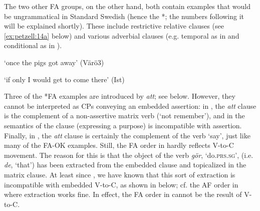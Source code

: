 \documentclass[output=paper,colorlinks,citecolor=brown,draft,draftmode]{langscibook}
\begin{document}
The two other FA groups, on the other hand, both contain examples that would be ungrammatical in Standard Swedish (hence the *; the numbers following it will be explained shortly). These include restrictive relative clauses (see \ref{ex:petzell:14a} below) and various adverbial clauses (e.g. temporal as in  and conditional as in ).


\ea\label{ex:petzell:14}

\glt `once the pigs got away’ (Värö3)

\glt `if only I would get to come there’ (Ist)
\z
\z


Three of the *FA examples are introduced by \textit{att}; see  below. However, they cannot be interpreted as CPs conveying an embedded assertion: in , the \textit{att} clause is the complement of a non-assertive matrix verb (‘not remember’), and in  the semantics of the clause (expressing a purpose) is incompatible with assertion. Finally, in , the \textit{att} clause is certainly the complement of the verb ‘say’, just like many of the FA-OK examples. Still, the FA order in  hardly reflects V-to-C movement. The reason for this is that the object of the verb \textit{gör}, ‘do.\textsc{prs}.\textsc{sg}’, (i.e. \textit{de}, ‘that’) has been extracted from the embedded clause and topicalized in the matrix clause. At least since \citet{Holmberg1986}, we have known that this sort of extraction is incompatible with embedded V-to-C, as shown in  below; cf. the AF order in  where extraction works fine. In effect, the FA order in  cannot be the result of V-to-C.
\end{document}
